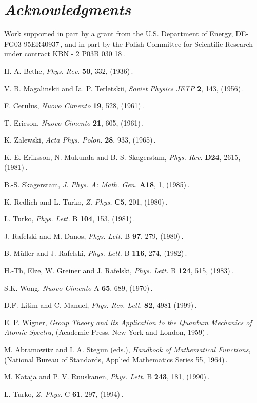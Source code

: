 \documentclass[a4paper,11pt]{article}
\begin{document}

\section*{\normalsize\it Acknowledgments}\noindent
Work supported in part by a grant from the U.S. Department of Energy,
DE-FG03-95ER40937\,, and in part by the Polish Committee for
Scientific Research under contract KBN - 2 P03B 030 18\,.
\begin{thebibliography}{99}
 H. A. Bethe, {\it Phys. Rev.} {\bf 50}, 332, (1936)\,.

V. B. Magalinskii and Ia. P. Terletskii, {\it Soviet Physics JETP}
{\bf 2}, 143,  (1956)\,.

F. Cerulus, {\it  Nuovo Cimento} {\bf 19}, 528, (1961)\,.

T. Ericson, {\it Nuovo Cimento} {\bf 21}, 605,  (1961)\,.

K. Zalewski, {\it  Acta Phys. Polon.} {\bf 28}, 933,  (1965)\,.

K.-E. Eriksson, N. Mukunda and B.-S. Skagerstam, {\it Phys. Rev.}
{\bf D24}, 2615, (1981)\,.

B.-S. Skagerstam, {\it J. Phys. A: Math. Gen.} {\bf A18}, 1,
(1985)\,.

K. Redlich and L. Turko, {\it Z. Phys.} {\bf C5}, 201,  (1980)\,.

 L. Turko, {\it Phys. Lett.} B {\bf 104}, 153,  (1981)\,.

J. Rafelski and M. Danos,  {\it Phys. Lett.} B {\bf 97}, 279,
(1980)\,.

B. M\"uller and J. Rafelski,  {\it Phys. Lett.} B {\bf 116}, 274,
(1982)\,.

H.-Th, Elze, W. Greiner and J. Rafelski, {\it Phys. Lett.} B {\bf
124}, 515, (1983)\,.

S.K. Wong, {\it Nuovo Cimento} A {\bf 65}, 689, (1970)\,.

D.F. Litim and C. Manuel, {\it Phys. Rev. Lett.} {\bf 82}, 4981
(1999)\,.

E. P. Wigner, {\it Group Theory and Its Application to the Quantum
Mechanics of Atomic Spectra}, (Academic Press, New York and
London, 1959)\,.

 M. Abramowitz and I. A. Stegun (eds.), {\it Handbook of
Mathematical Functions}, (National Bureau of Standards, Applied
Mathematics Series \myHighlight{$\cdot$}\coordHE{}  55, 1964)\,.

M. Kataja and P. V. Ruuskanen,  {\it Phys. Lett.} B {\bf 243},
181, (1990)\,.

L. Turko, {\it Z. Phys.} C {\bf 61}, 297,  (1994)\,.

\end{thebibliography}
\end{document}
